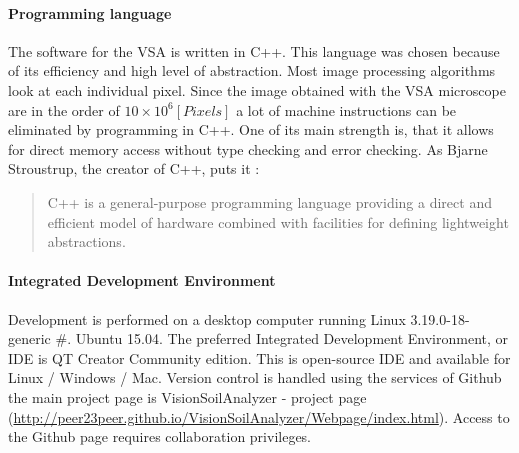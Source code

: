 \documentclass[11pt,fleqn,,a4paper,twoside,openright]{book}
\begin{document}
\paragraph{Programming language}
The software for the VSA is written in C++. This language was chosen because of its efficiency and high level of abstraction. Most image processing algorithms look at each individual pixel. Since the image obtained with the VSA microscope are in the order of $ 10 \times 10^6 [Pixels]$ a lot of machine instructions can be eliminated by programming in C++. One of its main strength is, that it allows for direct memory access without type checking and error checking. As Bjarne Stroustrup, the creator of C++, puts it \citeauthor{_c++_2013} \cite{_c++_2013} : \begin{quote}
	C++ is a general-purpose programming language providing a direct and efficient model of hardware combined with facilities for defining lightweight abstractions.
\end{quote}

\paragraph{Integrated Development Environment}
Development is performed on a desktop computer running Linux 3.19.0-18-generic \#. Ubuntu 15.04. The preferred Integrated Development Environment, or IDE is QT Creator Community edition. This is open-source IDE and available for Linux / Windows / Mac. Version control is handled using the services of Github the main project page is VisionSoilAnalyzer - project page (\url{http://peer23peer.github.io/VisionSoilAnalyzer/Webpage/index.html}). Access to the Github page requires collaboration privileges.
\end{document}
